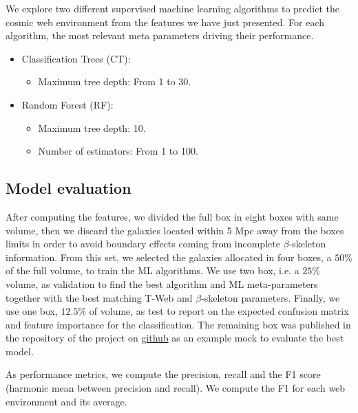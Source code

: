 \documentclass[usenatbib]{mnras}
\begin{document}
We explore two different supervised machine learning algorithms to
predict the cosmic web environment from the features we have just presented.
For each algorithm, the most relevant meta parameters driving their
performance.

\begin{itemize}
    \item Classification Trees (CT):
      \begin{itemize}
      \item Maximum tree depth: From 1 to 30.
      \end{itemize}
    \item Random Forest (RF):
        \begin{itemize}
            \item Maximum tree depth: 10.
            \item Number of estimators: From 1 to 100.
        \end{itemize}
\end{itemize}

\subsection{Model evaluation}

After computing the features, we divided the full box in eight boxes with same volume, then we discard the galaxies located within 5 Mpc away from the boxes limits in order to avoid boundary effects coming from incomplete $\beta$-skeleton information.  
From this set, we selected the galaxies allocated in four boxes, a $50\%$ of the full volume, to train the ML
algorithms.
We use two box, i.e. a $25\%$ volume, as validation to find the best algorithm and ML
meta-parameters together with the best matching T-Web and
$\beta$-skeleton parameters.   
Finally, we use one box, $12.5\%$ of volume, as test to report
on the expected confusion matrix and feature importance for the classification. The remaining box was published in the repository of the project on \href{https://github.com/jsuarez314/cosmicweb_bsk}{github} as an example mock to evaluate the best model.

As performance metrics, we compute the precision, recall and the F1
score (harmonic mean between precision and recall).  
We compute the F1 for each web environment and its average.
\end{document}
